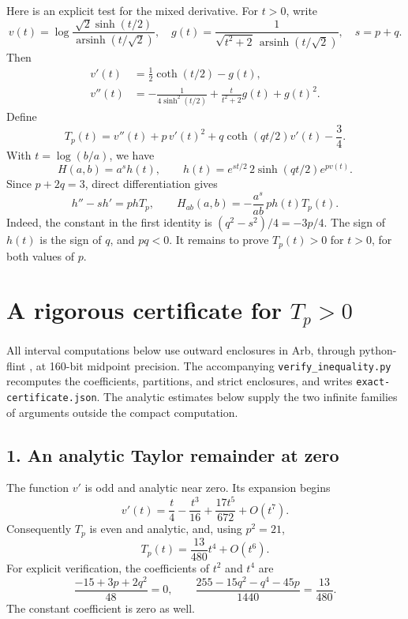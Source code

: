 \documentclass[11pt]{article}
\newcommand{\asinh}{\operatorname{arsinh}}
\begin{document}
Here is an explicit test for the mixed derivative. For \(t>0\), write
\[
 v(t)=\log\frac{\sqrt2\sinh(t/2)}{\asinh(t/\sqrt2)},\quad
 g(t)=\frac1{\sqrt{t^2+2}\,\asinh(t/\sqrt2)},\quad s=p+q.
\]
Then
\begin{align}
 v'(t)&=\tfrac12\coth(t/2)-g(t),\label{vprime}\\
 v''(t)&=-\frac1{4\sinh^2(t/2)}
              +\frac{t}{t^2+2}g(t)+g(t)^2.\label{vsecond}
\end{align}
Define
\begin{equation}\label{T}
 T_p(t)=v''(t)+p\,v'(t)^2+q\coth(qt/2)v'(t)-\frac34.
\end{equation}
With \(t=\log(b/a)\), we have
\[
 H(a,b)=a^s h(t),\qquad
 h(t)=e^{st/2}\,2\sinh(qt/2)e^{pv(t)}.
\]
Since \(p+2q=3\), direct differentiation gives
\[
 h''-s h'=p h T_p,\qquad
 H_{ab}(a,b)=-\frac{a^s}{ab}\,p h(t)T_p(t).
\]
Indeed, the constant in the first identity is
\((q^2-s^2)/4=-3p/4\).
The sign of \(h(t)\) is the sign of \(q\), and \(pq<0\).
It remains to prove \(T_p(t)>0\) for \(t>0\), for both values of \(p\).

\section*{A rigorous certificate for \(T_p>0\)}
All interval computations below use outward enclosures in Arb, through
python-flint \cite{arb}, at 160-bit midpoint precision. The accompanying
\texttt{verify\_inequality.py} recomputes the coefficients, partitions,
and strict enclosures, and writes \texttt{exact-certificate.json}.
The analytic estimates below supply the two infinite families of
arguments outside the compact computation.

\subsection*{1. An analytic Taylor remainder at zero}
The function \(v'\) is odd and analytic near zero. Its expansion begins
\[
 v'(t)=\frac t4-\frac{t^3}{16}+\frac{17t^5}{672}+O(t^7).
\]
Consequently \(T_p\) is even and analytic, and, using \(p^2=21\),
\begin{equation}\label{leading}
 T_p(t)=\frac{13}{480}t^4+O(t^6).
\end{equation}
For explicit verification, the coefficients of \(t^2\) and \(t^4\) are
\[
 \frac{-15+3p+2q^2}{48}=0,\qquad
 \frac{255-15q^2-q^4-45p}{1440}=\frac{13}{480}.
\]
The constant coefficient is zero as well.
\end{document}
